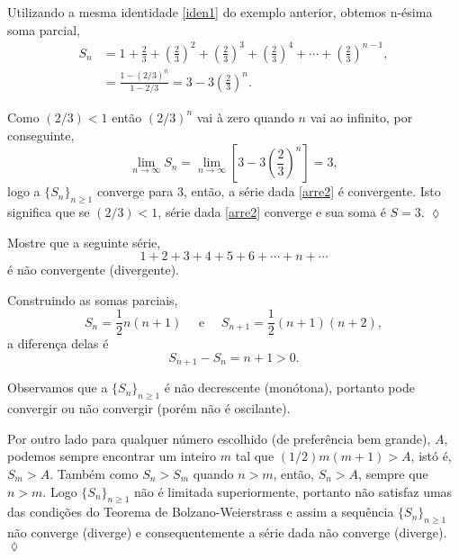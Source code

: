 \solo Utilizando a mesma identidade \eqref{iden1} do exemplo
anterior, obtemos n-\'{e}sima soma parcial,
\begin{align*}
  S_n &=1+\frac{2}{3}+\left(\frac{2}{3}\right)^2+\left(\frac{2}{3}\right)^3+\left(\frac{2}{3}\right)^4
+\cdots+\left(\frac{2}{3}\right)^{n-1}, \\[2ex]
   &=\frac{1-(2/3)^n}{1-2/3}=3-3\left(\frac{2}{3}\right)^n.
\end{align*}

Como $(2/3)<1$ ent\~{a}o $(2/3)^n$ vai \`{a} zero quando $n$ vai ao
infinito, por conseguinte,
\begin{equation*}
\lim_{n\to \infty}S_n=    \lim_{n\to
\infty}\left[3-3\left(\frac{2}{3}\right)^n\right]=3,
\end{equation*}
logo a \seq $\{S_n\}_{n\geq 1}$ converge para $3$, ent\~{a}o, a s\'{e}rie
dada  \eqref{arre2} \'{e} convergente. Isto significa que se
$(2/3)<1$, s\'{e}rie  dada \eqref{arre2} converge e sua soma \'{e} $S=3$.
\hfill \(\lozenge\)

\begin{exer}
Mostre que a seguinte s\'{e}rie,
\begin{equation*}
1+2+3+4+5+6+\cdots+n+\cdots
\end{equation*}
\'{e} n\~{a}o convergente (divergente).
\end{exer}

\solo Construindo as somas parciais,
\begin{equation*}
  S_n =\frac{1}{2}n(n+1)\quad\text{ e }\quad
  S_{n+1} =\frac{1}{2}(n+1)(n+2),
\end{equation*}
a diferen\c{c}a delas \'{e}
\begin{equation*}
 S_{n+1}-S_{n}=n+1>0.
\end{equation*}

Observamos que a \seq $\{S_n\}_{n\geq 1}$ \'{e} n\~{a}o decrescente
(mon\'{o}tona), portanto pode convergir ou n\~{a}o convergir (por\'{e}m n\~{a}o \'{e}
oscilante).

Por outro lado para qualquer n\'{u}mero  escolhido (de prefer\^{e}ncia bem
grande), $A$, podemos sempre encontrar um inteiro $m$ tal que
$(1/2)m(m+1)>A$, ist\'{o} \'{e}, $S_m>A$. Tamb\'{e}m como $S_n>S_m$ quando
$n>m$, ent\~{a}o, $S_n>A$, sempre que $n>m$. Logo $\{S_n\}_{n\geq 1}$
n\~{a}o \'{e} limitada superiormente, portanto n\~{a}o satisfaz umas das
condi\c{c}\~{o}es do Teorema de Bolzano-Weierstrass e assim a sequ\^{e}ncia
$\{S_n\}_{n\geq 1}$ n\~{a}o converge (diverge) e consequentemente a
s\'{e}rie dada n\~{a}o converge (diverge).\hfill \(\lozenge\)

